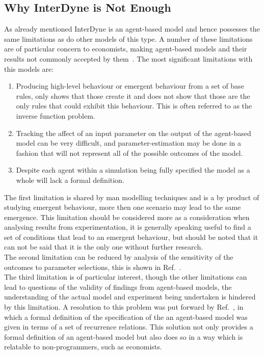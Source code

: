 \documentclass{article}
\begin{document}
\subsection{Why InterDyne is Not Enough} \label{Iinterdynenotenough}
As already mentioned InterDyne is an agent-based model and hence possesses the same limitations as do other models of this type. A number of these limitations are of particular concern to economists, making agent-based models and their results not commonly accepted by them~\cite{econmistsnoabm, lob_noecomimists}. The most significant limitations  with this models are:
 \begin{enumerate}
  \item Producing high-level behaviour or emergent behaviour from a set of base rules, only shows that those create it and does not show that those are the only rules that could exhibit this behaviour. This is often referred to as the inverse function problem.
  \item Tracking the affect of an input parameter on the output of the agent-based model can be very difficult, and parameter-estimation may be done in a fashion that will not represent all of the possible outcomes of the model. 
  \item Despite each agent within a simulation being fully specified the model as a whole will lack a formal definition. 
\end{enumerate}
The first limitation is shared by man modelling techniques and is a by product of studying emergent behaviour, more then one scenario may lead to the same emergence. This limitation should be considered more as a consideration when analysing results from experimentation, it is generally speaking useful to find a set of conditions that lead to an emergent behaviour, but should be noted that it can not be said that it is the only one without further research.\\
The second limitation can be reduced by analysis of the sensitivity of the outcomes to parameter selections, this is shown in Ref.~\cite{econmistsnoabm}.\\
The third limitation is of particular interest, though the other limitations can lead to questions of the validity of findings from agent-based models, the understanding of the actual model and experiment being undertaken is hindered by this limitation. A resolution to this problem was put forward by Ref.~\cite{econmistsnoabm}, in which a formal definition of the specification of the an agent-based model was given in terms of a set of recurrence relations. This solution not only provides a formal definition of an agent-based model but also does so in a way which is relatable to non-programmers, such as economists.     
\end{document}
